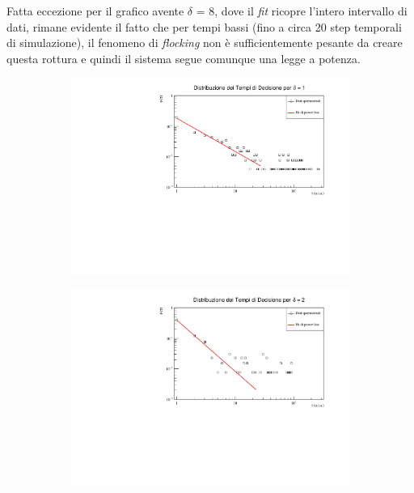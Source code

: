 \documentclass[letterpaper,10pt]{article}
\begin{document}
Fatta eccezione per il grafico avente $\delta$ = 8, dove il \textit{fit} ricopre l'intero intervallo di dati, rimane evidente il fatto che per tempi bassi (fino a circa 20 step temporali di simulazione), il fenomeno di \textit{flocking} non è sufficientemente pesante da creare questa rottura e quindi il sistema segue comunque una legge a potenza.\\
\begin{figure}[h]
\centering
\begin{subfigure}{0.925\textwidth}
\includegraphics[width=\linewidth]{Gravitazione/tau1.pdf}
\end{subfigure}
\begin{subfigure}{0.925\textwidth}
\includegraphics[width=\linewidth]{Gravitazione/tau2.pdf}
\end{subfigure}
\end{figure}\\
\end{document}
